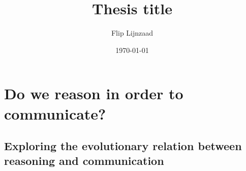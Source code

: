 \documentclass{article}
\title{Thesis title}
\author{Flip Lijnzaad}
\date{\today}
\begin{document}
\section*{\centering Do we reason in order to communicate?}
\subsection*{\centering Exploring the evolutionary relation between reasoning and communication}

\nocite{*}
\printbibliography[title=Preliminary bibliography]
\end{document}
